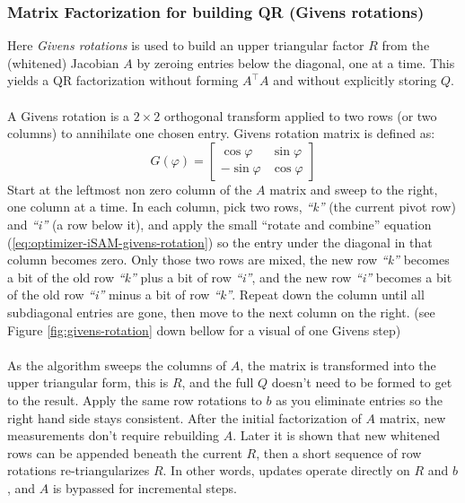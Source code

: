 \subsubsection{Matrix Factorization for building QR (Givens rotations)}
Here \emph{Givens rotations} is used to build an upper triangular factor $R$ from the (whitened) Jacobian $A$ by zeroing entries below the diagonal, one at a time. This yields a QR factorization without forming $A^\top A$ and without explicitly storing $Q$.
\\ \\
A Givens rotation is a $2\times 2$ orthogonal transform applied to two rows (or two columns) to annihilate one chosen entry. Givens rotation matrix is defined as:
\begin{equation}
    G(\varphi) =
    \begin{bmatrix}
        \cos\varphi & \sin\varphi \\
        -\sin\varphi & \cos\varphi
    \end{bmatrix}
    \label{eq:optimizer-iSAM-givens-rotation}
\end{equation}
Start at the leftmost non zero column of the $A$ matrix and sweep to the right, one column at a time. In each column, pick two rows, \textit{``k''} (the current pivot row) and \textit{``i''} (a row below it), and apply the small ``rotate and combine'' equation (\ref{eq:optimizer-iSAM-givens-rotation}) so the entry under the diagonal in that column becomes zero. Only those two rows are mixed, the new row \textit{``k''} becomes a bit of the old row \textit{``k''} plus a bit of row \textit{``i''}, and the new row \textit{``i''} becomes a bit of the old row \textit{``i''} minus a bit of row \textit{``k''}. Repeat down the column until all subdiagonal entries are gone, then move to the next column on the right. (see Figure \ref{fig:givens-rotation} down bellow for a visual of one Givens step)
\\ \\
As the algorithm sweeps the columns of $A$, the matrix is transformed into the upper triangular form, this is $R$, and the full $Q$ doesn't need to be formed to get to the result. Apply the same row rotations to $b$ as you eliminate entries so the right hand side stays consistent. After the initial factorization of $A$ matrix, new measurements don't require rebuilding $A$. Later it is shown that new whitened rows can be appended beneath the current $R$, then a short sequence of row rotations re-triangularizes $R$. In other words, updates operate directly on $R$ and $b$, and $A$ is bypassed for incremental steps.
